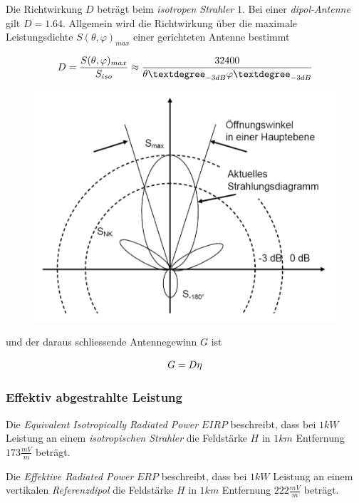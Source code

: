 \documentclass[
  10pt,
  a4paper,
  german]{article}
\numberwithin{equation}{section}
\begin{document}
Die Richtwirkung \(D\) beträgt beim \emph{isotropen Strahler} \(1\). Bei
einer \emph{dipol-Antenne} gilt \(D=1.64\). Allgemein wird die
Richtwirkung über die maximale Leistungsdichte
\(S(\theta,\varphi)_{max}\) einer gerichteten Antenne bestimmt

\[
D=\frac{S(\theta,\varphi)_{max}}{S_{iso}}\approx\frac{32400}{\theta°_{-3dB}\space\varphi°_{-3dB}}
\]

\begin{figure}[H]

{\centering \includegraphics{images/04_Richtdiagramm.png}

}

\end{figure}

und der daraus schliessende Antennegewinn \(G\) ist

\[
G=D\space\eta
\]

\hypertarget{effektiv-abgestrahlte-leistung}{%
\subsubsection{Effektiv abgestrahlte
Leistung}\label{effektiv-abgestrahlte-leistung}}

Die \emph{Equivalent Isotropically Radiated Power} \(EIRP\) beschreibt,
dass bei \(1kW\) Leistung an einem \emph{isotropischen Strahler} die
Feldstärke \(H\) in \(1km\) Entfernung \(173\frac{mV}{m}\) beträgt.

Die \emph{Effektive Radiated Power} \(ERP\) beschreibt, dass bei \(1kW\)
Leistung an einem vertikalen \emph{Referenzdipol} die Feldstärke \(H\)
in \(1km\) Entfernung \(222\frac{mV}{m}\) beträgt.
\end{document}
